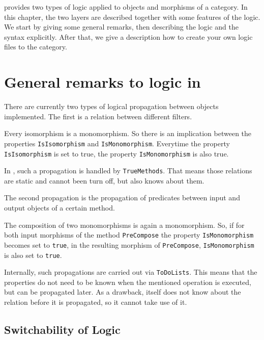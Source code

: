 \CapPkg provides two types of logic applied to objects and morphisms of a category.
In this chapter, the two layers are described together with some features of the logic.
We start by giving some general remarks, then describing the logic and the syntax explicitly.
After that, we give a description how to create your own logic files to the category.

\section{General remarks to logic in \CapPkg}

There are currently two types of logical propagation between \GAP objects implemented.
The first is a relation between different filters.

\begin{example}
 Every isomorphism is a monomorphism. So there is an implication between the properties
 \texttt{IsIsomorphism} and \texttt{IsMonomorphism}. Everytime the property \texttt{IsIsomorphism}
 is set to true, the property \texttt{IsMonomorphism} is also true.
\end{example}

In \CapPkg, such a propagation is handled by \texttt{TrueMethods}. That means those relations
are static and cannot been turn off, but also \GAP knows about them.

The second propagation is the propagation of predicates between input and output objects
of a certain method.

\begin{example}
  The composition of two monomorphisms is again a monomorphism. So, if for both input morphisms
  of the method \texttt{PreCompose} the property \texttt{IsMonomorphism} becomes set to \texttt{true},
  in the resulting morphism of \texttt{PreCompose}, \texttt{IsMonomorphism} is also set to \texttt{true}.
\end{example}

Internally, such propagations are carried out via \texttt{ToDoLists}. This means that the properties
do not need to be known when the mentioned operation is executed, but can be propagated later. As a drawback,
\GAP itself does not know about the relation before it is propagated, so it cannot take use of it.

\subsection{Switchability of Logic}

